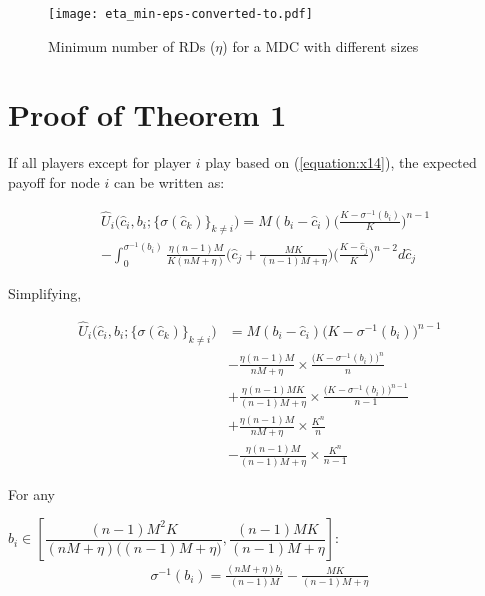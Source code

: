 \documentclass[journal,12pt, onecolumn]{IEEEtran}
\begin{document}
\begin{figure}
\begin{center}
\texttt{[image: eta\_min-eps-converted-to.pdf]}
\end{center}
\caption{Minimum number of RDs ($\eta$) for a MDC with different sizes}
\label{eta}
\end{figure}

\section{Proof of Theorem 1}
\label{p_t1}
If all players except for player $i$ play based on (\ref{equation:x14}), the expected payoff for node $i$ can be written as:

\begin{small}
\begin{align} 
\label{equation:x19}
&\widehat{U}_i \big(\widehat{c}_i , b_i ;\{\sigma(\widehat{c}_k)\}_{k \neq i} \big) = M(b_i - \widehat{c}_i) \big(\frac{K - \sigma ^{-1}(b_i)}{K}\big)^{n-1} 
\nonumber \\
&-
\int_{0} ^{\sigma ^{-1}(b_i)}\frac{\eta(n-1)M}{K(nM+\eta)}\big(\widehat{c}_j + \frac{MK}{(n-1)M+\eta}\big)\big(\frac{K- \widehat{c}_j}{K}\big)^{n-2}d\widehat{c}_j 
\end{align}
\end{small}
Simplifying,
\begin{small}
\begin{align} 
\label{equation:x20}
\widehat{U}_i \big(\widehat{c}_i , b_i ;\{\sigma(\widehat{c}_k)\}_{k \neq i}\big) &= M(b_i - \widehat{c}_i) \big(K - \sigma ^{-1}(b_i)\big)^{n-1}
\nonumber \\
&- \frac{\eta(n-1)M}{nM+\eta}\times\frac{\big(K - \sigma ^{-1}(b_i)\big)^{n}}{n} 
\nonumber
\\ & + \frac{\eta(n-1)MK}{(n-1)M+\eta}\times\frac{\big(K - \sigma ^{-1}(b_i)\big)^{n-1}}{n-1}
\nonumber
\\ &+ \frac{\eta(n-1)M}{nM+\eta}\times\frac{K^{n}}{n} 
\nonumber
\\ &
- \frac{\eta(n-1)M}{(n-1)M+\eta}\times\frac{K^{n}}{n-1}
\end{align}
\end{small}
For any \begin{small}
$b_i \in [\dfrac{(n-1) M^2 K}{(nM+ \eta)\big((n-1)M+\eta\big)},\dfrac{(n-1)MK}{(n-1)M+ \eta}]$:
\begin{align}
\label{equation:x21}
\sigma ^{-1}(b_i)= \frac{(nM+\eta)b_i}{(n-1)M} - \frac{MK}{(n-1)M+\eta}
\end{align}
\end{small}
\end{document}
